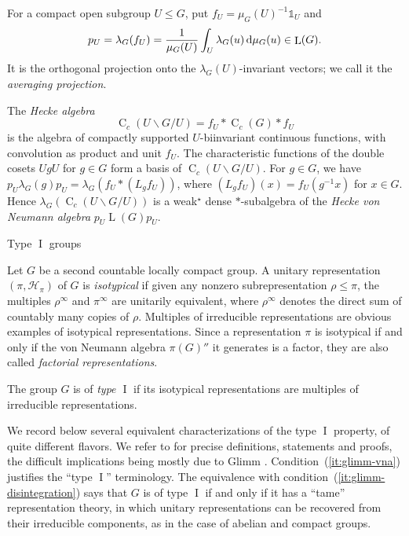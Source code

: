 \documentclass[11pt]{amsart}
\makeatletter
\numberwithin{equation}{section}
\def\subsection{\@startsection{subsection}{2}%
  \z@{.7\linespacing\@plus.7\linespacing}{.3\linespacing}%
  {\normalfont\bfseries}}
\newcommand{\un}{\mathds 1}
\renewcommand{\H}{\mathcal H}
\DeclareMathOperator{\LL}{L}
\DeclareMathOperator{\I}{I}
\newcommand{\rC}{\operatorname{C}}
\newcommand{\Hk}[2]{\rC_c(#2\backslash #1/#2)}
\theoremstyle{definition}
\makeatother
\begin{document}
For a compact open subgroup $U\leq G$, put $f_U=\mu_G(U)^{-1}\un_U$ and
$$
    p_U=\lambda_G(f_U)=\frac{1}{\mu_G(U)}\int_U\lambda_G(u)\,{\rm d}\mu_G(u)\in\LL(G).
$$
It is the orthogonal projection onto the $\lambda_G(U)$-invariant vectors; we call it the \emph{averaging projection}.

The \emph{Hecke algebra}
$$
    \Hk GU=f_U\ast\rC_c(G)\ast f_U
$$
is the algebra of compactly supported $U$-biinvariant continuous functions, with convolution as product and unit $f_U$. The characteristic functions of the double cosets $UgU$ for $g\in G$ form a basis of $\Hk GU$. For $g\in G$, we have $p_U\lambda_G(g)p_U=\lambda_G(f_U\ast(L_gf_U))$, where $(L_gf_U)(x)=f_U(g^{-1}x)$ for $x\in G$. Hence $\lambda_G(\Hk GU)$ is a weak$^\star$ dense $*$-subalgebra of the \emph{Hecke von Neumann algebra} $p_U\LL(G)p_U$.


\subsection{Type \texorpdfstring{$\I$}{I} groups}
\label{subsec:prelim-type-i-groups}

Let $G$ be a second countable locally compact group. A unitary representation $(\pi,\H_{\pi})$ of $G$ is \emph{isotypical} if given any nonzero subrepresentation $\rho\leq \pi$, the multiples $\rho^{\infty}$ and $\pi^{\infty}$ are unitarily equivalent, where $\rho^{\infty}$ denotes the direct sum of countably many copies of $\rho$. Multiples of irreducible representations are obvious examples of isotypical representations. Since a representation $\pi$ is isotypical if and only if the von Neumann algebra $\pi(G)''$ it generates is a factor, they are also called \emph{factorial representations}. 



The group $G$ is of \emph{type $\I$} if its isotypical representations are multiples of irreducible representations.

We record below several equivalent characterizations of the type $\I$ property, of quite different flavors. We refer to \cite[Sections~6.D and~8.F]{BH20} for precise definitions, statements and proofs, the difficult implications being mostly due to Glimm \cite{Gl61}. Condition~\textup{(\ref*{it:glimm-vna})} justifies the ``type $\I$'' terminology. The equivalence with condition~\textup{(\ref*{it:glimm-disintegration})} says that $G$ is of type $\I$ if and only if it has a ``tame'' representation theory, in which unitary representations can be recovered from their irreducible components, as in the case of abelian and compact groups.
\end{document}

